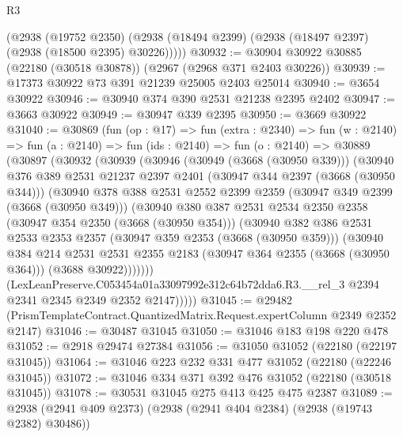 \begin{lexlean}{R3}
\begin{coremodule}
      (@2938
        (@19752 @2350)
        (@2938 (@18494 @2399) (@2938 (@18497 @2397) (@2938 (@18500 @2395) @30226)))))
@30932 := @30904 @30922 @30885 (@22180 (@30518 @30878)) (@2967 (@2968 @371 @2403 @30226))
@30939 := @17373 @30922 @73 @391 @21239 @25005 @2403 @25014
@30940 := @3654 @30922
@30946 := @30940 @374 @390 @2531 @21238 @2395 @2402
@30947 := @3663 @30922
@30949 := @30947 @339 @2395
@30950 := @3669 @30922
@31040 := @30869
    (fun (op : @17) =>
    fun (extra : @2340) =>
    fun (w : @2140) =>
    fun (a : @2140) =>
    fun (ids : @2140) =>
    fun (o : @2140) =>
    @30889
      (@30897
        (@30932
          (@30939
            (@30946
              (@30949 (@3668 (@30950 @339)))
              (@30940
                @376
                @389
                @2531
                @21237
                @2397
                @2401
                (@30947 @344 @2397 (@3668 (@30950 @344)))
                (@30940
                  @378
                  @388
                  @2531
                  @2552
                  @2399
                  @2359
                  (@30947 @349 @2399 (@3668 (@30950 @349)))
                  (@30940
                    @380
                    @387
                    @2531
                    @2534
                    @2350
                    @2358
                    (@30947 @354 @2350 (@3668 (@30950 @354)))
                    (@30940
                      @382
                      @386
                      @2531
                      @2533
                      @2353
                      @2357
                      (@30947 @359 @2353 (@3668 (@30950 @359)))
                      (@30940
                        @384
                        @214
                        @2531
                        @2531
                        @2355
                        @2183
                        (@30947 @364 @2355 (@3668 (@30950 @364)))
                        (@3688 @30922)))))))
            (LexLeanPreserve.C053454a01a33097992e312c64b72dda6.R3.__rel_3
              @2394
              @2341
              @2345
              @2349
              @2352
              @2147)))))
@31045 := @29482 (PrismTemplateContract.QuantizedMatrix.Request.expertColumn @2349 @2352 @2147)
@31046 := @30487 @31045
@31050 := @31046 @183 @198 @220 @478
@31052 := @2918 @29474 @27384
@31056 := @31050 @31052 (@22180 (@22197 @31045))
@31064 := @31046 @223 @232 @331 @477 @31052 (@22180 (@22246 @31045))
@31072 := @31046 @334 @371 @392 @476 @31052 (@22180 (@30518 @31045))
@31078 := @30531 @31045 @275 @413 @425 @475 @2387
@31089 := @2938 (@2941 @409 @2373) (@2938 (@2941 @404 @2384) (@2938 (@19743 @2382) @30486))

\end{coremodule}
\end{lexlean}
